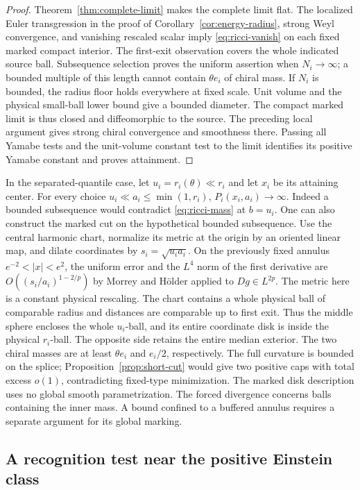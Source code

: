 \begin{proof}
Theorem~\ref{thm:complete-limit} makes the complete limit flat.
The localized Euler transgression in the proof of
Corollary~\ref{cor:energy-radius}, strong Weyl convergence, and
vanishing rescaled scalar imply \eqref{eq:ricci-vanish} on each
fixed marked compact interior. The first-exit observation covers
the whole indicated source ball. Subsequence selection proves
the uniform assertion when \(N_i\to\infty\); a bounded multiple
of this length cannot contain \(\theta e_i\) of chiral mass.
If \(N_i\) is bounded, the radius floor holds everywhere at fixed
scale. Unit volume and the physical small-ball lower bound give a
bounded diameter. The compact marked limit is thus closed and
diffeomorphic to the source. The preceding local argument gives
strong chiral convergence and smoothness there. Passing all Yamabe
tests and the unit-volume constant test to the limit identifies its
positive Yamabe constant and proves attainment.
\end{proof}

In the separated-quantile case, let \(u_i=r_i(\theta)\ll r_i\)
and let \(x_i\) be its attaining center. For every choice
\(u_i\ll a_i\le\min(1,r_i)\), \(P_i(x_i,a_i)\to\infty\).
Indeed a bounded subsequence would contradict \eqref{eq:ricci-mass}
at \(b=u_i\). One can also construct the marked cut on the hypothetical bounded
subsequence. Use the central harmonic chart, normalize its metric at
the origin by an oriented linear map, and dilate coordinates by
\(s_i=\sqrt{u_i a_i}\). On the previously fixed annulus
\(e^{-2}<|x|<e^2\), the uniform error and the \(L^4\) norm of the
first derivative are \(O((s_i/a_i)^{1-2/p})\) by Morrey and
H\"older applied to \(Dg\in L^{2p}\). The metric here is a constant
physical rescaling. The chart contains a whole physical ball of
comparable radius and distances are comparable up to first exit.
Thus the middle sphere encloses the whole \(u_i\)-ball, and its
entire coordinate disk is inside the physical \(r_i\)-ball. The
opposite side retains the entire median exterior. The two chiral
masses are at least \(\theta e_i\) and \(e_i/2\), respectively.
The full curvature is bounded on the splice; Proposition~\ref{prop:short-cut}
would give two positive caps with total excess \(o(1)\), contradicting
fixed-type minimization. The marked disk description uses no global
smooth parametrization. The forced divergence concerns balls
containing the inner mass. A bound confined to a buffered annulus
requires a separate argument for its global marking.

\subsection{A recognition test near the positive Einstein class}

